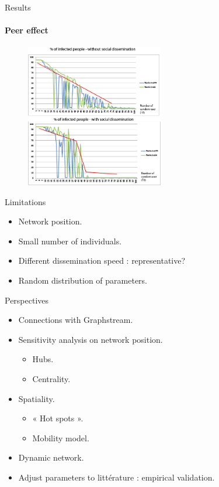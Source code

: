 \documentclass{beamer}
\begin{document}
\begin{frame}{Results}
\framesubtitle{\bf{Peer effect}}
	\begin{figure}[H]
		\centering
		\includegraphics[width=6.0cm]{./img/infected_socialdissemination_comparison.png}
	\end{figure} 
\end{frame}

\begin{frame}{Limitations}
	\begin{itemize}
		\item Network position.
		\item Small number of individuals.
		\item Different dissemination speed : representative?
		\item Random distribution of parameters.
	\end{itemize}
\end{frame}

\begin{frame}{Perspectives}
	\begin{itemize}
		\item Connections with Graphstream.
		\item Sensitivity analysis on network position.
			\begin{itemize}
				\item Hubs.
				\item Centrality.
			\end{itemize}
		\item Spatiality.
			\begin{itemize}
				\item « Hot spots ».
				\item Mobility model.
			\end{itemize}
		\item Dynamic network.
		\item Adjust parameters to littérature : empirical validation.
	\end{itemize}
\end{frame}
\end{document}
